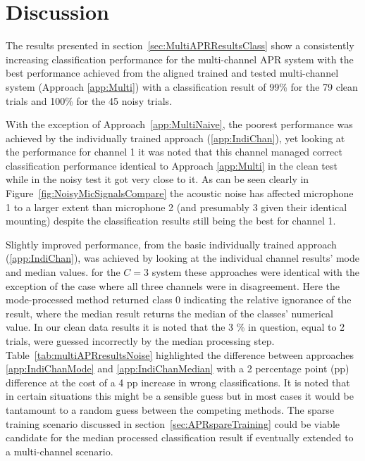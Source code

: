\section{Discussion}
The results presented in section~\ref{sec:MultiAPRResultsClass} show a consistently increasing classification performance for the multi-channel APR system with the best performance achieved from the aligned trained and tested multi-channel system (Approach \ref{app:Multi}) with a classification result of 99\% for the 79 clean trials and 100\% for the 45 noisy trials.

With the exception of Approach~\ref{app:MultiNaive}, the poorest performance was achieved by the individually trained approach (\ref{app:IndiChan}), yet looking at the performance for channel 1 it was noted that this channel managed correct classification performance identical to Approach \ref{app:Multi} in the clean test while in the noisy test it got very close to it. As can be seen clearly in Figure~\ref{fig:NoisyMicSignalsCompare} the acoustic noise has affected microphone 1 to a larger extent than microphone 2 (and presumably 3 given their identical mounting) despite the classification results still being the best for channel 1.

Slightly improved performance, from the basic individually trained approach (\ref{app:IndiChan}), was achieved by looking at the individual channel results' mode and median values. for the $C=3$ system these approaches were identical with the exception of the case where all three channels were in disagreement. Here the mode-processed method returned class 0 indicating the relative ignorance of the result, where the median result returns the median of the classes' numerical value. In our clean data results it is noted that the 3 \% in question, equal to 2 trials, were guessed incorrectly by the median processing step. Table~\ref{tab:multiAPRresultsNoise} highlighted the difference between approaches \ref{app:IndiChanMode} and \ref{app:IndiChanMedian} with a 2 percentage point (pp) difference at the cost of a 4 pp increase in wrong classifications. It is noted that in certain situations this might be a sensible guess but in most cases it would be tantamount to a random guess between the competing methods. The sparse training scenario discussed in section~\ref{sec:APRspareTraining} could be viable candidate for the median processed classification result if eventually extended to a multi-channel scenario.

